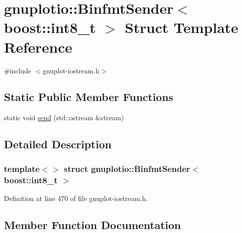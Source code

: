 \hypertarget{structgnuplotio_1_1_binfmt_sender_3_01boost_1_1int8__t_01_4}{}\section{gnuplotio\+:\+:Binfmt\+Sender$<$ boost\+:\+:int8\+\_\+t $>$ Struct Template Reference}
\label{structgnuplotio_1_1_binfmt_sender_3_01boost_1_1int8__t_01_4}


{\ttfamily \#include $<$gnuplot-\/iostream.\+h$>$}

\subsection*{Static Public Member Functions}
\begin{DoxyCompactItemize}
\item 
static void \hyperlink{structgnuplotio_1_1_binfmt_sender_3_01boost_1_1int8__t_01_4_a6f61d43b0da25f044bfad0d45fe888b4}{send} (std\+::ostream \&stream)
\end{DoxyCompactItemize}


\subsection{Detailed Description}
\subsubsection*{template$<$$>$\newline
struct gnuplotio\+::\+Binfmt\+Sender$<$ boost\+::int8\+\_\+t $>$}



Definition at line 470 of file gnuplot-\/iostream.\+h.



\subsection{Member Function Documentation}
\mbox{\label{structgnuplotio_1_1_binfmt_sender_3_01boost_1_1int8__t_01_4_a6f61d43b0da25f044bfad0d45fe888b4}} 
